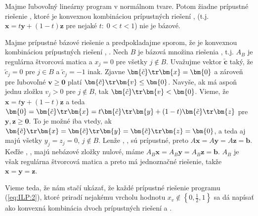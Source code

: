 \begin{lema}
  \label{lm:konvex}
  Majme ľubovoľný lineárny program v normálnom tvare. Potom žiadne prípustné riešenie , ktoré
  je konvexnou kombináciou prípustných riešení ,  (t.j. $\bm{x}=t\bm{y}+(1-t)\bm{z}$ pre
  nejaké $t:\;0<t<1$) nie je bázové.
\end{lema}
\begin{dokaz}
  Majme prípustné bázové riešenie  a predpokladajme sporom, že je
  konvexnou kombináciou prípustných riešení , . Nech $B$ je bázová
  množina riešenia , t.j. $A_B$ je regulárna štvorcová matica a $x_j=0$
  pre všetky $j\not\in B$. Uvažujme vektor $\bm{\tilde{c}}$ taký, že
  $\tilde{c}_j=0$ pre $j\in B$ a $\tilde{c}_j=-1$ inak. Zjavne
  $\bm{\tilde{c}}\tr\bm{x}=\bm{0}$ a zároveň pre ľubovoľné $\bm{v}\ge\bm{0}$
  platí $\bm{\tilde{c}}\tr\bm{v}\le\bm{0}$. Navyše, ak  má aspoň jednu
  zložku $v_j>0$ pre $j\not\in B$, tak $\bm{\tilde{c}}\tr\bm{v}<\bm{0}$.
%
  Vieme, že $\bm{x}=t\bm{y}+(1-t)\bm{z}$ a teda
  $\bm{0}=\bm{\tilde{c}}\tr\bm{x}=t\bm{\tilde{c}}\tr\bm{y}+(1-t)\bm{\tilde{c}}\tr\bm{z}$
  pre $\bm{y},\bm{z}\ge\bm{0}$. To je možné iba vtedy, ak
  $\bm{\tilde{c}}\tr\bm{x}=\bm{\tilde{c}}\tr\bm{y}=\bm{\tilde{c}}\tr\bm{z}=\bm{0}$,
  a teda  aj  majú všetky $y_j=z_j=0$, $j\not\in B$.
%
  Lenže , ,  sú prípustné, preto $A\bm{x}=A\bm{y}=A\bm{z}=\bm{b}$.
  Keďže , ,  majú nebázové zložky nulové, máme
  $A_B\bm{x}=A_B\bm{y}=A_B\bm{z}=\bm{b}$. $A_B$ je však regulárna štvorcová matica
  a preto má jednoznačné riešenie, takže $\bm{x}=\bm{y}=\bm{z}$.
\end{dokaz}

\noindent
Vieme teda, že nám stačí ukázať, že každé prípustné riešenie  programu (\ref{eq:ILP:2}), ktoré 
priradí nejakému vrcholu hodnotu $x_v\not\in\left\{0,\frac{1}{2},1\right\}$ sa dá napísať
ako konvexná kombinácia dvoch prípustných riešení  a .

